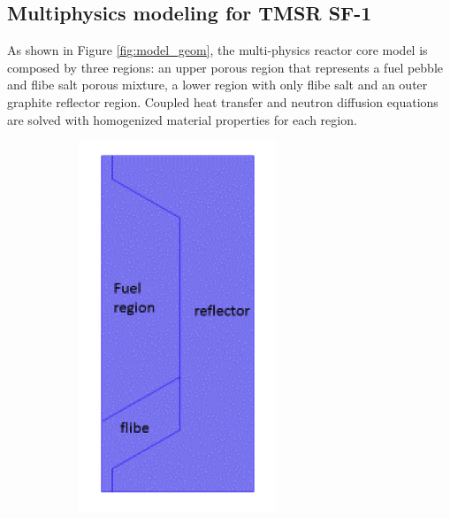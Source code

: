 \documentclass{elsarticle}
\begin{document}
\subsection{Multiphysics modeling for TMSR SF-1}

As shown in Figure \ref{fig:model_geom}, the multi-physics reactor core model is composed by three regions: an upper porous region that represents a fuel pebble and flibe salt porous mixture, a lower region with only flibe salt and an outer graphite reflector region. Coupled heat transfer and neutron diffusion equations are solved with homogenized material properties for each region. 


\begin{figure}[h]
  \centering
  \begin{subfigure}{0.2\textwidth}
    \includegraphics[width = \columnwidth]{./images/diffusion/tmsr/2d_schematic.png}

\end{subfigure}
\end{figure}
\end{document}

